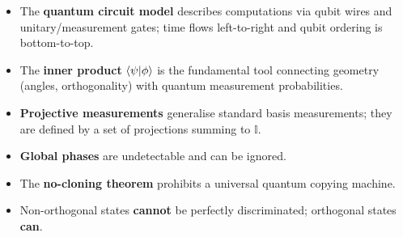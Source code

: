 \documentclass[11pt]{article}
\theoremstyle{definition}
\begin{document}
\begin{itemize}
    \item The \textbf{quantum circuit model} describes computations via qubit wires and unitary/measurement gates; time flows left-to-right and qubit ordering is bottom-to-top.
    \item The \textbf{inner product} $\braket{\psi}{\phi}$ is the fundamental tool connecting geometry (angles, orthogonality) with quantum measurement probabilities.
    \item \textbf{Projective measurements} generalise standard basis measurements; they are defined by a set of projections summing to $\mathbb{I}$.
    \item \textbf{Global phases} are undetectable and can be ignored.
    \item The \textbf{no-cloning theorem} prohibits a universal quantum copying machine.
    \item Non-orthogonal states \textbf{cannot} be perfectly discriminated; orthogonal states \textbf{can}.
\end{itemize}
\end{document}
